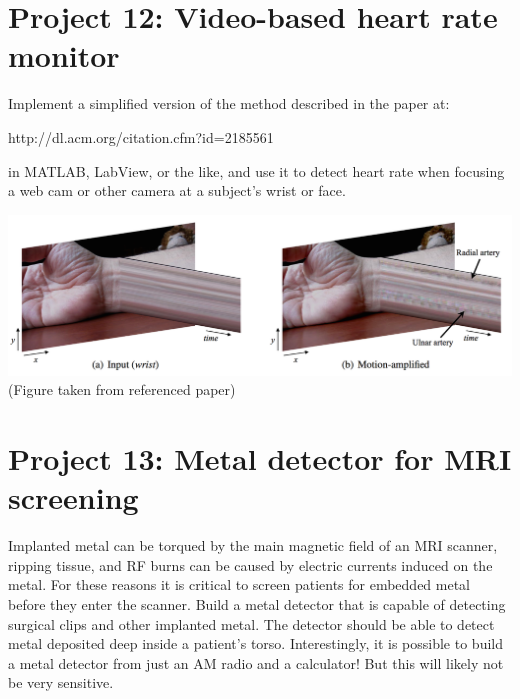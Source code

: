 \documentclass[12pt]{article}
\begin{document}
\newpage

\section*{Project 12: Video-based heart rate monitor}

Implement a simplified version of the method described in the paper at:
\begin{center}
 http://dl.acm.org/citation.cfm?id=2185561 
 \end{center}
 in MATLAB, LabView, or the like, and use it to detect heart rate when focusing a web cam or other camera at a subject's wrist or face. 

\begin{center}
\includegraphics[width=\textwidth,trim=0 0 0 0,clip=false]{wrist_heartrate.png}
(Figure taken from referenced paper)
\end{center}

\newpage 
\section*{Project 13: Metal detector for MRI screening}

Implanted metal can be torqued by the main magnetic field of an MRI scanner,
ripping tissue, 
and RF burns can be caused by electric currents induced on the metal. 
For these reasons it is critical to screen patients for embedded metal before they enter the 
scanner. 
Build a metal detector that is capable of detecting surgical clips and other implanted metal.
The detector should be able to detect metal deposited deep inside a patient's torso.
Interestingly, it is possible to build a metal detector from just an AM radio and a calculator! 
But this will likely not be very sensitive. 

%
%
%
%
\end{document}
